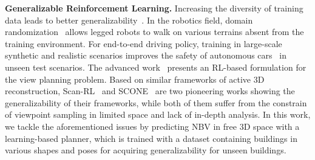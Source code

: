     \noindent\textbf{Generalizable Reinforcement Learning.}
    Increasing the diversity of training data leads to better generalizability~\citep{cobbe2020leveraging}.
    In the robotics field, domain randomization~\citep{tobin2017domain} allows legged robots to walk on various terrains absent from the training environment. For end-to-end driving policy, training in large-scale synthetic and realistic scenarios improves the safety of autonomous cars~\citep{li2022metadrive, li2023scenarionet} in unseen test scenarios.
    The advanced work~\citep{devrim2017reinforcement} presents an RL-based formulation for the view planning problem. Based on similar frameworks of active 3D reconstruction, Scan-RL~\citep{peralta2020next} and SCONE~\citep{guedonscone} are two pioneering works showing the generalizability of their frameworks, while both of them suffer from the constrain of viewpoint sampling in limited space and lack of in-depth analysis.
    In this work, we tackle the aforementioned issues by predicting NBV in free 3D space with a learning-based planner, which is trained with a dataset containing buildings in various shapes and poses for acquiring generalizability for unseen buildings. 

